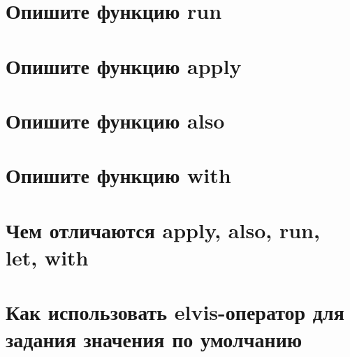 \documentclass[12pt]{article}
\begin{document}
\section*{Опишите функцию run}
\begin{enumerate}[leftmargin=*]
\end{enumerate}
\vspace{2mm}
\section*{Опишите функцию apply}
\begin{enumerate}[leftmargin=*]
\end{enumerate}
\vspace{2mm}
\section*{Опишите функцию also}
\begin{enumerate}[leftmargin=*]
\end{enumerate}
\vspace{2mm}
\section*{Опишите функцию with}
\begin{enumerate}[leftmargin=*]
\end{enumerate}
\vspace{2mm}
\section*{Чем отличаются apply, also, run, let, with}
\begin{enumerate}[leftmargin=*]
\end{enumerate}
\vspace{2mm}
\section*{Как использовать elvis-оператор для задания значения по умолчанию}
\begin{enumerate}[leftmargin=*]
\end{enumerate}
\vspace{2mm}
\end{document}
